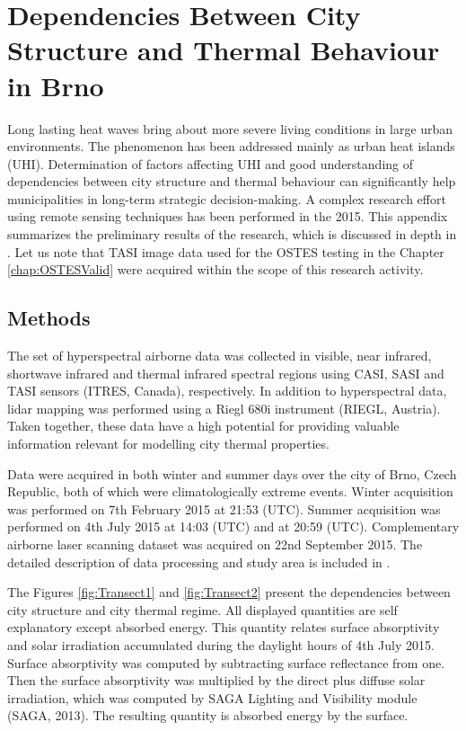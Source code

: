 \chapter{Dependencies Between City Structure and Thermal Behaviour in Brno}
\label{app:Visualisation}

Long lasting heat waves bring about more severe living conditions in large urban environments. The phenomenon has been addressed mainly as urban heat islands (UHI). Determination of factors affecting UHI and good understanding of dependencies between city structure and thermal behaviour can significantly help municipalities in long-term strategic decision-making. A complex research effort using remote sensing techniques has been performed in the 2015. This appendix summarizes the preliminary results of the research, which is discussed in depth in \cite{NP16}. Let us note that TASI image data used for the OSTES testing in the Chapter \ref{chap:OSTESValid} were acquired within the scope of this research activity.

\section{Methods} 

The set of hyperspectral airborne data was collected in visible, near infrared, shortwave infrared and thermal infrared spectral regions using CASI, SASI and TASI sensors (ITRES, Canada), respectively. In addition to hyperspectral data, lidar mapping was performed using a Riegl 680i instrument (RIEGL, Austria). Taken together, these data have a high potential for providing valuable information relevant for modelling city thermal properties.

Data were acquired in both winter and summer days over the city of Brno, Czech Republic, both of which were climatologically extreme events. Winter acquisition was performed on 7th February 2015 at 21:53 (UTC). Summer acquisition was performed on 4th July 2015 at 14:03 (UTC) and at 20:59 (UTC). Complementary airborne laser scanning dataset was acquired on 22nd September 2015. The detailed description of data processing and study area is included in \cite{NP16}. 

The Figures \ref{fig:Transect1} and \ref{fig:Transect2} present the dependencies between city structure and city thermal regime. All displayed quantities are self explanatory except absorbed energy. This quantity relates surface absorptivity and solar irradiation accumulated during the daylight hours of 4th July 2015. Surface absorptivity was computed by subtracting surface reflectance from one. Then the surface absorptivity was multiplied by the direct plus diffuse solar irradiation, which was computed by SAGA Lighting and Visibility module (SAGA, 2013). The resulting quantity is absorbed energy by the surface.

